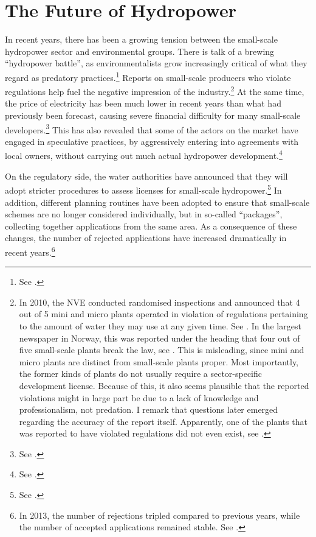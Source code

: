 \section{The Future of Hydropower}\label{sec:future}

In recent years, there has been a growing tension between the small-scale hydropower sector and environmental groups. There is talk of a brewing ``hydropower battle'', as environmentalists grow increasingly critical of what they regard as predatory practices.\footnote{See \cite{haltbrekken12}.}
Reports on small-scale producers who violate regulations help fuel the negative impression of the industry.\footnote{In 2010, the NVE conducted randomised inspections and announced that 4 out of 5 mini and micro plants operated in violation of regulations pertaining to the amount of water they may use at any given time. See \cite{ulovlig10}. In the largest newspaper in Norway, this was reported under the heading that four out of five small-scale plants break the law, see \cite{ulovlig10b}. This is misleading, since mini and micro plants are distinct from small-scale plants proper. Most importantly, the former kinds of plants do not usually require a sector-specific development license. Because of this, it also seems plausible that the reported violations might in large part be due to a lack of knowledge and professionalism, not predation. I remark that questions later emerged regarding the accuracy of the report itself. Apparently, one of the plants that was reported to have violated regulations did not even exist, see \cite{tvilsom10}.} At the same time, the price of electricity has been much lower in recent years than what had previously been forecast, causing severe financial difficulty for many small-scale developers.\footnote{See \cite{sunde14}.} This has also revealed that some of the actors on the market have engaged in speculative practices, by aggressively entering into agreements with local owners, without carrying out much actual hydropower development.\footnote{See \cite{endresen14}.}

On the regulatory side, the water authorities have announced that they will adopt stricter procedures to assess licenses for small-scale hydropower.\footnote{See \cite{lie12}.} In addition, different planning routines have been adopted to ensure that small-scale schemes are no longer considered individually, but in so-called ``packages'', collecting together applications from the same area. As a consequence of these changes, the number of rejected applications have increased dramatically in recent years.\footnote{In 2013, the number of rejections tripled compared to previous years, while the number of accepted applications remained stable. See \cite{sunde14b}.}

